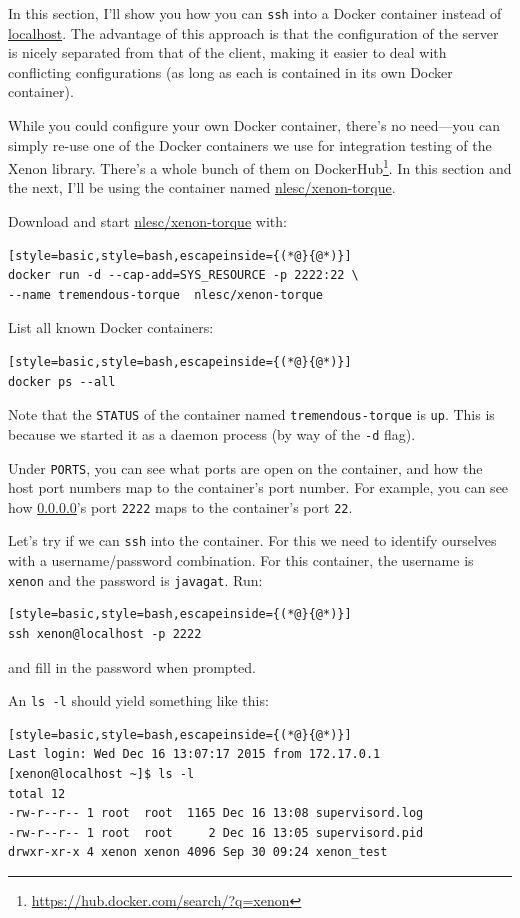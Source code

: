 \documentclass[12pt, a4paper, twoside, openany, titlepage]{book}
\begin{document}
In this section, I'll show you how you can \texttt{ssh} into a Docker container instead of \url{localhost}. The advantage of this approach is that the configuration of the server is nicely separated from that of the client, making it easier to deal with conflicting configurations (as long as each is contained in its own Docker container).

While you could configure your own Docker container, there's no need---you can simply re-use one of the Docker containers we use for integration testing of the Xenon library. There's a whole bunch of them on DockerHub\footnote{\url{https://hub.docker.com/search/?q=xenon}}. In this section and the next, I'll be using the container named \url{nlesc/xenon-torque}.

Download and start \url{nlesc/xenon-torque} with:
\begin{lstlisting}[style=basic,style=bash,escapeinside={(*@}{@*)}]
docker run -d --cap-add=SYS_RESOURCE -p 2222:22 \
--name tremendous-torque  nlesc/xenon-torque
\end{lstlisting}


List all known Docker containers:
\begin{lstlisting}[style=basic,style=bash,escapeinside={(*@}{@*)}]
docker ps --all
\end{lstlisting}
Note that the \texttt{STATUS} of the container named \texttt{tremendous-torque} is \texttt{up}. This is because we started it as a daemon process (by way of the \texttt{-d} flag).

Under \texttt{PORTS}, you can see what ports are open on the container, and how the host port numbers map to the container's port number. For example, you can see how \url{0.0.0.0}'s port \texttt{2222} maps to the container's port \texttt{22}.

Let's try if we can \texttt{ssh} into the container. For this we need to identify ourselves with a username/password combination. For this container, the username is \texttt{xenon} and the password is \texttt{javagat}. Run:
\begin{lstlisting}[style=basic,style=bash,escapeinside={(*@}{@*)}]
ssh xenon@localhost -p 2222
\end{lstlisting}
and fill in the password when prompted.

An \texttt{ls -l} should yield something like this:
\begin{lstlisting}[style=basic,style=bash,escapeinside={(*@}{@*)}]
Last login: Wed Dec 16 13:07:17 2015 from 172.17.0.1
[xenon@localhost ~]$ ls -l
total 12
-rw-r--r-- 1 root  root  1165 Dec 16 13:08 supervisord.log
-rw-r--r-- 1 root  root     2 Dec 16 13:05 supervisord.pid
drwxr-xr-x 4 xenon xenon 4096 Sep 30 09:24 xenon_test
\end{lstlisting} %
\end{document}
